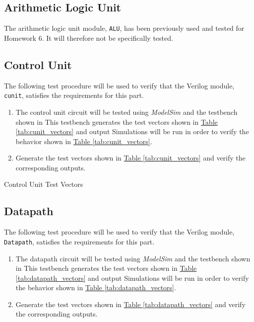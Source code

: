\subsection{Arithmetic Logic Unit} %
\label{sub:arithmetic_logic_unit}

The arithmetic logic unit module, \verb|ALU|, has been previously used and tested for Homework 6.
It will therefore not be specifically tested.

\subsection{Control Unit} %
\label{sub:control_unit}

The following test procedure will be used to verify that the Verilog module, \verb|cunit|, satisfies the requirements for this part.

\begin{enumerate}
    \item The control unit circuit will be tested using \emph{ModelSim} and the testbench shown in %
    This testbench generates the test vectors shown in \hyperref[tab:cunit_vectors]{Table \ref*{tab:cunit_vectors}} and output %
    Simulations will be run in order to verify the behavior shown in \hyperref[tab:cunit_vectors]{Table \ref*{tab:cunit_vectors}}.
    \item Generate the test vectors shown in \hyperref[tab:cunit_vectors]{Table \ref*{tab:cunit_vectors}} and verify the corresponding outputs.
\end{enumerate}

\begin{table}[htbp]
    \centering
    \caption{Control Unit Test Vectors\label{tab:cunit_vectors}}
\end{table}


\subsection{Datapath} %
\label{sub:datapath}

The following test procedure will be used to verify that the Verilog module, \verb|Datapath|, satisfies the requirements for this part.

\begin{enumerate}
    \item The datapath circuit will be tested using \emph{ModelSim} and the testbench shown in %
    This testbench generates the test vectors shown in \hyperref[tab:datapath_vectors]{Table \ref*{tab:datapath_vectors}} and output %
    Simulations will be run in order to verify the behavior shown in \hyperref[tab:datapath_vectors]{Table \ref*{tab:datapath_vectors}}.
    \item Generate the test vectors shown in \hyperref[tab:datapath_vectors]{Table \ref*{tab:datapath_vectors}}
    and verify the corresponding outputs.
\end{enumerate}

